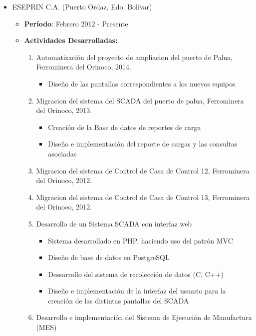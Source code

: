 \documentclass[letterpaper,12pt]{report}
\begin{document}
    \begin{itemize}

        \item{ESEPRIN C.A. (Puerto Ordaz, Edo. Bolívar)}
        \begin{itemize}
        \item{\textbf{Período}: Febrero 2012 - Presente}
        \item{\textbf{Actividades Desarrolladas:}}
            \begin{enumerate}
            \item Automatización del proyecto de ampliacion del puerto de Palua, Ferrominera del Orinoco, 2014.
                \begin{itemize}
                    \item Diseño de las pantallas correspondientes a los nuevos equipos
                \end{itemize}
            \item Migracion del sistema del SCADA del puerto de palua, Ferrominera del Orinoco, 2013.
                \begin{itemize}
                    \item Creación de la Base de datos de reportes de carga
                    \item Diseño e implementación del reporte de cargas y las consultas asociadas
                \end{itemize}
            \item Migracion del sistema de Control de Casa de Control 12, Ferrominera del Orinoco, 2012.
            \item Migracion del sistema de Control de Casa de Control 13, Ferrominera del Orinoco, 2012.
            \item Desarrollo de un Sistema SCADA con interfaz web
                \begin{itemize}
                \item Sistema desarrollado en PHP, haciendo uso del patrón MVC
                \item Diseño de base de datos en PostgreSQL
                \item Dessarrollo del sistema de recolección de datos (C, C++)
                \item Diseño e implementación de la interfaz del usuario para la creación de las distintas pantallas del SCADA
                \end{itemize}
            \item Desarrollo e implementación del Sistema de Ejecución de Manufactura (MES)

\end{enumerate}
\end{itemize}
\end{itemize}
\end{document}
